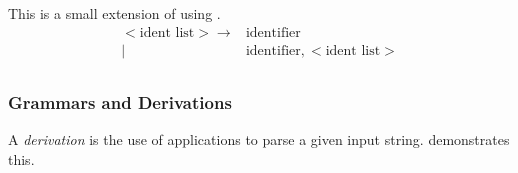 This is a small extension of using .
\begin{equation}\label{eq:Describing_Lists}
  \begin{aligned}
    <\text{ident list}> \rightarrow &\text{identifier} \\
    \vert &\text{identifier}, <\text{ident list}> \\
  \end{aligned}
\end{equation}

\subsubsection{Grammars and Derivations}\label{subsubsec:Grammars_and_Derivations}
\begin{definition}[Derivation]\label{def:Derivation}
  A \emph{derivation} is the use of  applications to parse a given input string.
   demonstrates this.
\end{definition}

